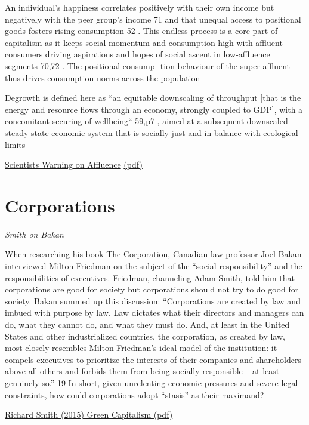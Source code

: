 \documentclass[
]{book}
\begin{document}
An individual's happiness correlates
positively with their own income but negatively with the peer
group's income 71 and that unequal access to positional goods
fosters rising consumption 52 . This endless process is a core part
of capitalism as it keeps social momentum and consumption high
with affluent consumers driving aspirations and hopes of social
ascent in low-affluence segments 70,72 . The positional consump-
tion behaviour of the super-affluent thus drives consumption
norms across the population

Degrowth is defined here as ``an equitable
downscaling of throughput {[}that is the energy and resource flows
through an economy, strongly coupled to GDP{]}, with a
concomitant securing of wellbeing`` 59,p7 , aimed at a subsequent
downscaled steady-state economic system that is socially just and
in balance with ecological limits

\href{https://www.nature.com/articles/s41467-020-16941-y}{Scientists Warning on Affluence}
\href{/pdf/Wiedmann_2020_Scientists_Warning_on_Affluence.pdf}{(pdf)}

\hypertarget{corporations}{%
\chapter{Corporations}\label{corporations}}

\emph{Smith on Bakan}

When
researching his book The Corporation, Canadian law professor Joel Bakan
interviewed Milton Friedman on the subject of the ``social responsibility'' and the
responsibilities of executives. Friedman, channeling Adam Smith, told him that
corporations are good for society but corporations should not try to do good for
society. Bakan summed up this discussion: ``Corporations are created by law and
imbued with purpose by law. Law dictates what their directors and managers can do,
what they cannot do, and what they must do. And, at least in the United States and
other industrialized countries, the corporation, as created by law, most closely
resembles Milton Friedman's ideal model of the institution: it compels executives to
prioritize the interests of their companies and shareholders above all others and
forbids them from being socially responsible -- at least genuinely so.'' 19 In short,
given unrelenting economic pressures and severe legal constraints, how could
corporations adopt ``stasis'' as their maximand?

\href{pdf/Richard_Smith_Green_Capitalism_the_God_that_Failed.pdf}{Richard Smith (2015) Green Capitalism (pdf)}
\end{document}
